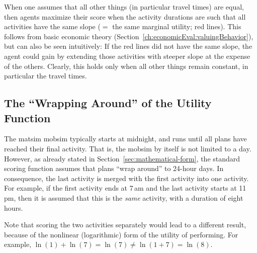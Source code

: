 When one assumes that all other things (in particular travel times) are equal, then agents maximize their score when the activity durations are such that all activities have the same slope ($=$ the same marginal utility; red lines).  This follows from basic economic theory (\cf Section~\ref{ch:economicEval:valuingBehavior}), but can also be seen intuitively: If the red lines did not have the same slope, the agent could gain by extending those activities with steeper slope at the expense of the others.  Clearly, this holds only when all other things remain constant, in particular the travel times.

\subsection{The \enquote{Wrapping Around} of the Utility Function}
\label{sec:wrap-around}
The \gls{matsim} \gls{mobsim} typically starts at midnight, and runs until all plans have reached their final activity.  That is, the \gls{mobsim} by itself is not limited to a day.  However, as already stated in Section~\ref{sec:mathematical-form}, the standard scoring function assumes that plans ``wrap around'' to 24-hour days.  In consequence, the last activity is merged with the first activity into one activity. For example, if the first activity ends at 7\,am and the last activity starts at 11\,pm, then it is assumed that this is the \emph{same} activity, with a duration of eight\,hours.

Note that scoring the two activities separately would lead to a different result, because of the nonlinear (logarithmic) form of the utility of performing. For example, $\ln(1) + \ln(7) = \ln(7) \ne \ln(1 + 7) = \ln(8)$.

